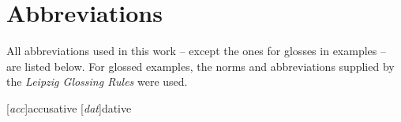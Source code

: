 \chapter{Abbreviations}



All abbreviations used in this work -- except the ones for glosses in examples -- are listed below. For glossed examples, the norms and abbreviations supplied by the  \emph{Leipzig Glossing Rules} \citep[cf.][]{LeipzigGloss15a} were used.



\begin{acronym}[n--sg--strong]
%
	[\textit{acc}]{accusative}
%
%
%
	[\textit{dat}]{dative}
%
%
%
%
%
%
%
%
%
%
%
%
%
%
%
%
%
%
%
%
\end{acronym}
